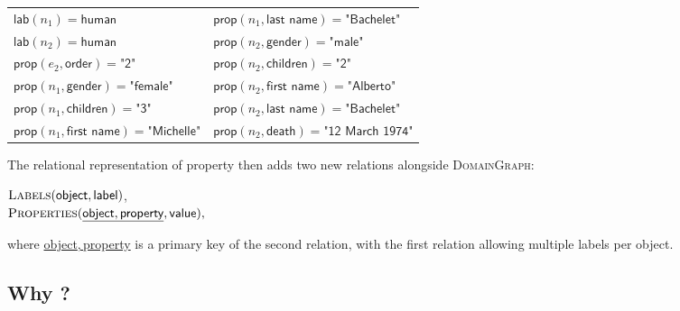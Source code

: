 \begin{center}
{\small
\begin{tabular}{ll}
$\textsf{lab}(n_1)= \textsf{human}$ &
$\textsf{prop}(n_1,\textsf{last name}) = \textsf{"Bachelet"}$\\
$\textsf{lab}(n_2) = \textsf{human}$ &
$\textsf{prop}(n_2,\textsf{gender}) = \textsf{"male"}$\\
$\textsf{prop}(e_2,\textsf{order}) = \textsf{"2"}$ &
$\textsf{prop}(n_2,\textsf{children}) = \textsf{"2"}$\\
$\textsf{prop}(n_1,\textsf{gender}) = \textsf{"female"}$ &
$\textsf{prop}(n_2,\textsf{first name}) = \textsf{"Alberto"}$\\
$\textsf{prop}(n_1,\textsf{children}) = \textsf{"3"}$ &
$\textsf{prop}(n_2,\textsf{last name}) = \textsf{"Bachelet"}$\\
$\textsf{prop}(n_1,\textsf{first name}) = \textsf{"Michelle"}$ &
$\textsf{prop}(n_2,\textsf{death}) = \textsf{"12 March 1974"}$
\end{tabular}
}
\end{center}
%
\medskip

\noindent The relational representation of property \data then adds two new relations alongside \textsc{DomainGraph}:
\begin{center}
$\textsc{Labels}(\textsf{object},\textsf{label})$,\\
$\textsc{Properties}(\underline{\textsf{object},\textsf{property}},\textsf{value}),$
\end{center}
%
where \underline{\textsf{object},\,\textsf{property}} is a primary key of the second relation, with the first relation allowing multiple labels per object.


\subsection{Why \datas?}\label{ssec:whydg}

